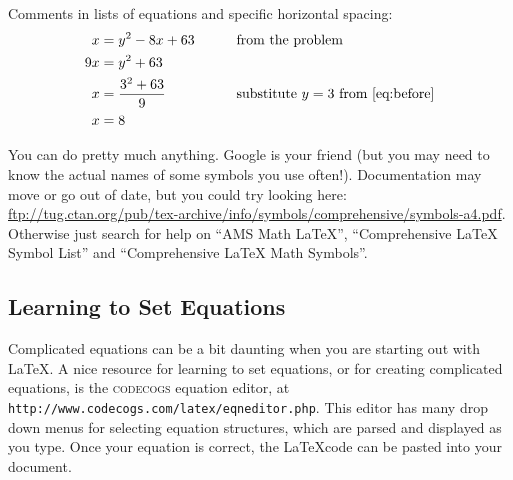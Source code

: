 Comments in lists of equations and specific horizontal spacing:
\begin{alignat}{2}
    x &= y^2 - 8x + 63 & \qquad & \text{from the problem} \label{eq:problem}\\
    9x &= y^2 + 63 && \notag \\
    x &= \frac{3^2 + 63}{9} && \text{substitute $y=3$ from \eqref{eq:before}}\notag \\
    x &= 8 && \label{eq:solution}
\end{alignat}

You can do pretty much anything. Google is your friend (but you may need to know the actual names of some symbols you use often!). Documentation may move or go out of date, but you could try looking here: \url{ftp://tug.ctan.org/pub/tex-archive/info/symbols/comprehensive/symbols-a4.pdf}. Otherwise just search for help on ``AMS Math LaTeX'', ``Comprehensive LaTeX Symbol List'' and ``Comprehensive LaTeX Math Symbols''.

\subsection{Learning to Set Equations}\label{sec:setting_equations}

Complicated equations can be a bit daunting when you are starting out with \LaTeX. A nice resource for learning to set equations, or for creating complicated equations, is the \textsc{codecogs} equation editor, at \texttt{http://www.codecogs.com/latex/eqneditor.php}. This editor has many drop down menus for selecting equation structures, which are parsed and displayed as you type. Once your equation is correct, the \LaTeX  \enspace code can be pasted into your document.

